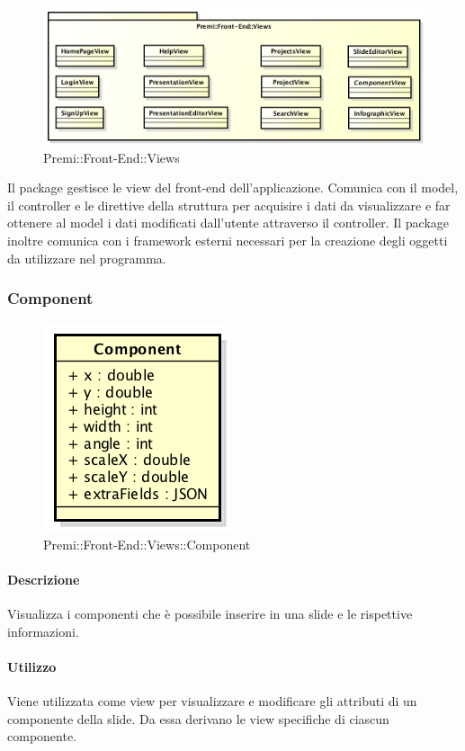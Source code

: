 \begin{figure}[h]
	\centering
	\includegraphics[width=0.7\linewidth]{img/premi_front_end_views}
	\caption[Premi::Front-End::Views]{Premi::Front-End::Views}
\end{figure}
Il package gestisce le view del \gls{front-end} dell'applicazione. Comunica con il model, il controller e le direttive della struttura per acquisire i dati da visualizzare e far ottenere al model i dati modificati dall'utente attraverso il controller. Il package inoltre comunica con i \gls{framework} esterni necessari per la creazione degli oggetti da utilizzare nel programma.

\subsubsection{Component}
	\begin{figure}[h]
		\centering
		\includegraphics[width=0.3\linewidth]{img/premi_front_end_views_component}
		\caption[Premi::Front-End::Views::Component]{Premi::Front-End::Views::Component}
	\end{figure}
	
	\paragraph{Descrizione}
	Visualizza i componenti che è possibile inserire in una \gls{slide} e le rispettive informazioni.
	
	\paragraph{Utilizzo}
	Viene utilizzata come view per visualizzare e modificare gli attributi di un componente della \gls{slide}. Da essa derivano le view specifiche di ciascun componente.
	
